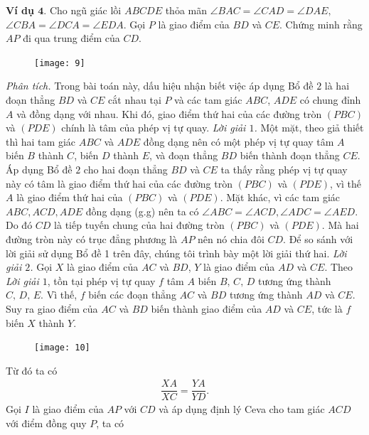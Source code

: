\begin{multicols}{2}
	\vskip 0.1cm
	\textbf{\color{diendantoanhoc}Ví dụ $\pmb{4.}$} Cho ngũ giác lồi $ABCDE$ thỏa mãn $\angle BAC = \angle CAD = \angle DAE,$ $\angle CBA = \angle DCA =\angle EDA$. Gọi $P$ là giao điểm của $BD$ và $CE$. Chứng minh rằng $AP$ đi qua trung điểm của $CD$. 
	\begin{figure}[H]
		\vspace*{-5pt}
		\centering
		\captionsetup{labelformat= empty, justification=centering}
		\texttt{[image: 9]}
		\vspace*{-15pt}
	\end{figure}
	\textit{Phân tích.} Trong bài toán này, dấu hiệu nhận biết việc áp dụng Bổ đề $2$ là hai đoạn thẳng $BD$ và $CE$ cắt nhau tại $P$ và các tam giác $ABC$, $ADE$ có chung đỉnh $A$ và đồng dạng với nhau. Khi đó, giao điểm thứ hai của các đường tròn $(PBC)$ và $(PDE)$ chính là tâm của phép vị tự quay. 
	\vskip 0.1cm
	\textit{Lời giải $1$.} Một mặt, theo giả thiết thì hai tam giác $ABC$ và $ADE$ đồng dạng nên có một phép vị tự quay tâm $A$ biến $B$ thành $C$, biến $D$ thành $E$, và đoạn thẳng $BD$ biến thành đoạn thẳng $CE$. Áp dụng Bổ đề $2$ cho hai đoạn thẳng $BD$ và $CE$ ta thấy rằng phép vị tự quay này có tâm là giao điểm thứ hai của các đường tròn $(PBC)$ và $(PDE)$, vì thế $A$ là giao điểm thứ hai của $(PBC)$ và $(PDE)$.
	\vskip 0.1cm
	Mặt khác, vì các tam giác $ABC,ACD,ADE$ đồng dạng (g.g) nên ta có $\angle ABC = \angle ACD, \angle ADC = \angle AED$. Do đó $CD$ là tiếp tuyến chung của hai đường tròn $(PBC)$ và $(PDE)$. Mà hai đường tròn này có trục đẳng phương là $AP$ nên nó chia đôi $CD$.
	\vskip 0.1cm
	Để so sánh với lời giải sử dụng Bổ đề 1 trên đây, chúng tôi trình bày một lời giải thứ hai.
	\textit{Lời giải $2$.} Gọi $X$ là giao điểm của $AC$ và $BD$, $Y$ là giao điểm của $AD$ và $CE$. Theo \textit{Lời giải $1$}, tồn tại phép vị tự quay $f$ tâm $A$ biến $B,\,C,\,D$ tương ứng thành $C,\,D,\,E$. Vì thế, $f$ biến các đoạn thẳng $AC$ và $BD$ tương ứng thành $AD$ và $CE$. Suy ra giao điểm của $AC$ và $BD$ biến thành giao điểm của $AD$ và $CE$, tức là $f$ biến $X$ thành $Y$.
	\begin{figure}[H]
		\vspace*{-5pt}
		\centering
		\captionsetup{labelformat= empty, justification=centering}
		\texttt{[image: 10]}
		\vspace*{-15pt}
	\end{figure}
	Từ đó ta có
	\begin{align*}
		\dfrac{XA}{XC} = \dfrac{YA}{YD}. \tag{$*$}
	\end{align*}
	Gọi $I$ là giao điểm của $AP$ với $CD$ và áp dụng định lý Ceva cho tam giác $ACD$ với điểm đồng quy $P$, ta có

\end{multicols}
